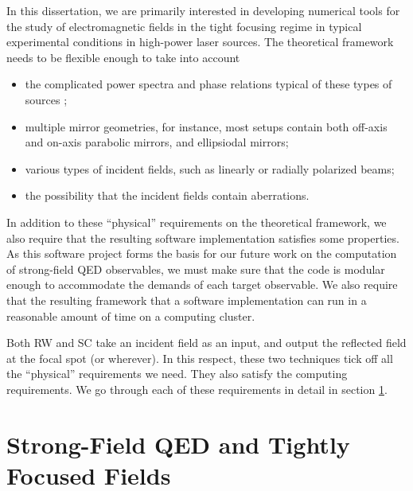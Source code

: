 \documentclass[11pt,SymmetricalJury]{inrsthesis/inrsthesis}
\begin{document}
In this dissertation, we are primarily interested in developing numerical tools for the
study of electromagnetic fields in the tight focusing regime in typical experimental
conditions in high-power laser sources. The theoretical framework needs to be
flexible enough to take into account
  \begin{itemize}
    \item the complicated power spectra and phase relations
          typical of these types of sources \cite{Jeong2015};
    \item multiple mirror geometries, for instance, most setups contain both
          off-axis and on-axis parabolic mirrors, and ellipsiodal mirrors;
    \item various types of incident fields, such as linearly or radially polarized beams;
    \item the possibility that the incident fields contain aberrations.
  \end{itemize}
In addition to these ``physical'' requirements on the theoretical framework,
we also require that the resulting software implementation satisfies some
properties. As this software project forms the basis for our future work
on the computation of strong-field QED observables, we must make sure that
the code is modular enough to accommodate the demands of each target observable.
We also require that the resulting framework that a software implementation
can run in a reasonable amount of time on a computing cluster.

Both RW and SC take an incident field as an input, and output the reflected
field at the focal spot (or wherever). In this respect, these two techniques
tick off all the ``physical'' requirements we need. They also satisfy
the computing requirements. We go through each of these requirements in detail
in section \ref{}.



\section{Strong-Field QED and Tightly Focused Fields}
\end{document}
